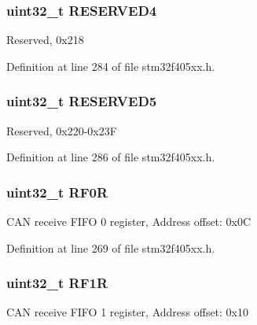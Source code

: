 \subsubsection[{\texorpdfstring{R\+E\+S\+E\+R\+V\+E\+D4}{RESERVED4}}]{\setlength{\rightskip}{0pt plus 5cm}uint32\+\_\+t R\+E\+S\+E\+R\+V\+E\+D4}\hypertarget{struct_c_a_n___type_def_ac0018930ee9f18afda25b695b9a4ec16}{}\label{struct_c_a_n___type_def_ac0018930ee9f18afda25b695b9a4ec16}
Reserved, 0x218 

Definition at line 284 of file stm32f405xx.\+h.

\subsubsection[{\texorpdfstring{R\+E\+S\+E\+R\+V\+E\+D5}{RESERVED5}}]{\setlength{\rightskip}{0pt plus 5cm}uint32\+\_\+t R\+E\+S\+E\+R\+V\+E\+D5}\hypertarget{struct_c_a_n___type_def_ad2cc1bcf210515d6f5a416d3f17313c5}{}\label{struct_c_a_n___type_def_ad2cc1bcf210515d6f5a416d3f17313c5}
Reserved, 0x220-\/0x23F 

Definition at line 286 of file stm32f405xx.\+h.

\subsubsection[{\texorpdfstring{R\+F0R}{RF0R}}]{ uint32\+\_\+t R\+F0R}\hypertarget{struct_c_a_n___type_def_accf4141cee239380d0ad4634ee21dbf6}{}\label{struct_c_a_n___type_def_accf4141cee239380d0ad4634ee21dbf6}
C\+AN receive F\+I\+FO 0 register, Address offset\+: 0x0C 

Definition at line 269 of file stm32f405xx.\+h.

\subsubsection[{\texorpdfstring{R\+F1R}{RF1R}}]{ uint32\+\_\+t R\+F1R}\hypertarget{struct_c_a_n___type_def_a02b589bb589df4f39e549dca4d5abb08}{}\label{struct_c_a_n___type_def_a02b589bb589df4f39e549dca4d5abb08}
C\+AN receive F\+I\+FO 1 register, Address offset\+: 0x10 

